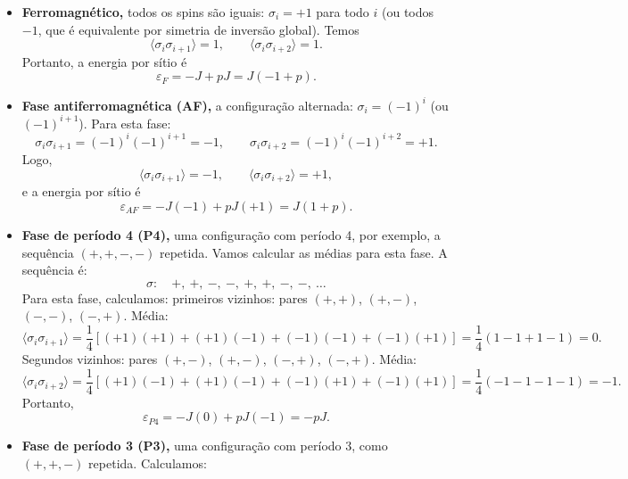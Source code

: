 \documentclass[11pt,a4paper]{article}
\begin{document}
\begin{itemize}
    \item \textbf{Ferromagnético,} todos os spins são iguais: \(\sigma_i = +1\) para todo \(i\) (ou todos \(-1\), que é equivalente por simetria de inversão global). Temos
%
\begin{equation}
    \langle \sigma_i \sigma_{i+1} \rangle = 1,
    \qquad
    \langle \sigma_i \sigma_{i+2} \rangle = 1.
\end{equation}
%
Portanto, a energia por sítio é
%
\begin{equation}
    \varepsilon_F = -J + pJ = J(-1 + p).
    \label{eq:eps_F}
\end{equation}   
%   
    \item \textbf{Fase antiferromagnética (AF),} a configuração alternada: \(\sigma_i = (-1)^i\) (ou \((-1)^{i+1}\)). Para esta fase:
%
\begin{equation}
    \sigma_i \sigma_{i+1} = (-1)^i (-1)^{i+1} = -1,
    \qquad
    \sigma_i \sigma_{i+2} = (-1)^i (-1)^{i+2} = +1.
\end{equation}
%
Logo,
%
\begin{equation}
    \langle \sigma_i \sigma_{i+1} \rangle = -1,
    \qquad
    \langle \sigma_i \sigma_{i+2} \rangle = +1,
\end{equation}
%
e a energia por sítio é
%
\begin{equation}
    \varepsilon_{AF} = -J(-1) + pJ(+1) = J(1 + p).
    \label{eq:eps_AF}
\end{equation}
%
    \item \textbf{Fase de período 4 (P4),} uma configuração com período 4, por exemplo, a sequência \( (+,+,-,-) \) repetida. Vamos calcular as médias para esta fase. A sequência é:
%
\[
\sigma: \quad +,\ +,\ -,\ -,\ +,\ +,\ -,\ -,\ \dots
\]
%
Para esta fase, calculamos: primeiros vizinhos: pares \((+,+)\), \((+,-)\), \((-,-)\), \((-,+)\). Média:
  \[
  \langle \sigma_i \sigma_{i+1} \rangle = \frac{1}{4} \left[ (+1)(+1) + (+1)(-1) + (-1)(-1) + (-1)(+1) \right]
  = \frac{1}{4} (1 - 1 + 1 - 1) = 0.
  \]
%
Segundos vizinhos: pares \((+, -)\), \((+ , -)\), \((- , +)\), \((- , +)\). Média:
  \[
  \langle \sigma_i \sigma_{i+2} \rangle = \frac{1}{4} \left[ (+1)(-1) + (+1)(-1) + (-1)(+1) + (-1)(+1) \right]
  = \frac{1}{4} (-1 -1 -1 -1) = -1.
  \]
%
Portanto,
%
\begin{equation}
    \varepsilon_{P4} = -J(0) + pJ(-1) = -pJ.
    \label{eq:eps_P4}
\end{equation}
%
    \item \textbf{Fase de período 3 (P3),} uma configuração com período 3, como \((+,+,-)\) repetida. Calculamos:

\end{itemize}
\end{document}
